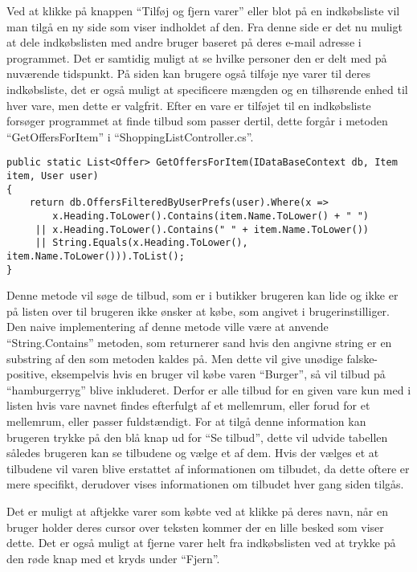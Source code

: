 Ved at klikke på knappen ``Tilføj og fjern varer'' eller blot på en indkøbsliste vil man tilgå en ny side som viser indholdet af den.
Fra denne side er det nu muligt at dele indkøbslisten med andre bruger baseret på deres e-mail adresse i programmet.
Det er samtidig muligt at se hvilke personer den er delt med på nuværende tidspunkt.
På siden kan brugere også tilføje nye varer til deres indkøbsliste, det er også muligt at specificere mængden og en tilhørende enhed til hver vare, men dette er valgfrit.
Efter en vare er tilføjet til en indkøbsliste forsøger programmet at finde tilbud som passer dertil, dette forgår i metoden ``GetOffersForItem'' i ``ShoppingListController.cs''.
\begin{lstlisting}[caption="Metoden ``GetOffersForItem'' finder relevante tilbud og returner dem som en liste", label=getoffersforitem]
public static List<Offer> GetOffersForItem(IDataBaseContext db, Item item, User user)
{
    return db.OffersFilteredByUserPrefs(user).Where(x => 
     	x.Heading.ToLower().Contains(item.Name.ToLower() + " ") 
     || x.Heading.ToLower().Contains(" " + item.Name.ToLower()) 
     || String.Equals(x.Heading.ToLower(), item.Name.ToLower())).ToList();
}
\end{lstlisting}
Denne metode vil søge de tilbud, som er i butikker brugeren kan lide og ikke er på listen over til brugeren ikke ønsker at købe, som angivet i brugerinstilliger. 
Den naive implementering af denne metode ville være at anvende ``String.Contains'' metoden, som returnerer sand hvis den angivne string er en substring af den som metoden kaldes på. 
Men dette vil give unødige falske-positive, eksempelvis hvis en bruger vil købe varen ``Burger'', så vil tilbud på ``hamburgerryg'' blive inkluderet.
Derfor er alle tilbud for en given vare kun med i listen hvis vare navnet findes efterfulgt af et mellemrum, eller forud for et mellemrum, eller passer fuldstændigt.
For at tilgå denne information kan brugeren trykke på den blå knap ud for  ``Se tilbud'', dette vil udvide tabellen således brugeren kan se tilbudene og vælge et af dem.
Hvis der vælges et at tilbudene vil varen blive erstattet af informationen om tilbudet, da dette oftere er mere specifikt, derudover vises informationen om tilbudet hver gang siden tilgås.

Det er muligt at aftjekke varer som købte ved at klikke på deres navn, når en bruger holder deres cursor over teksten kommer der en lille besked som viser dette. 
Det er også muligt at fjerne varer helt fra indkøbslisten ved at trykke på den røde knap med et kryds under ``Fjern''. 

